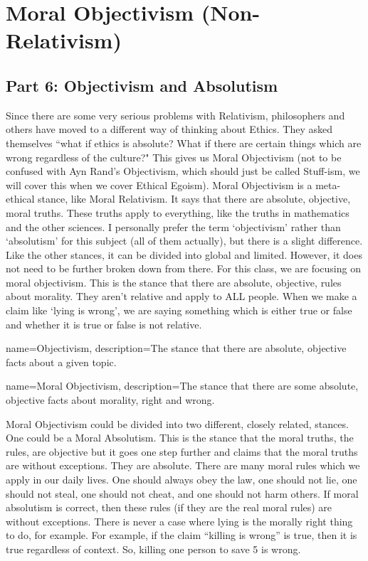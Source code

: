 \part{Moral Objectivism (Non-Relativism)}
\label{ch.mod2}
\chapter{Part 6: Objectivism and Absolutism}
Since there are some very serious problems with Relativism, philosophers and others have moved to a different way of thinking about Ethics. They asked themselves ``what if ethics is absolute? What if there are certain things which are wrong regardless of the culture?" This gives us \gls{Moral Objectivism} (not to be confused with Ayn Rand's Objectivism, which should just be called Stuff-ism, we will cover this when we cover Ethical Egoism). Moral Objectivism is a meta-ethical stance, like Moral Relativism. It says that there are absolute, objective, moral truths. These truths apply to everything, like the truths in mathematics and the other sciences.  I personally prefer the term ‘objectivism’ rather than ‘absolutism’ for this subject (all of them actually), but there is a slight difference. Like the other stances, it can be divided into global and limited. However, it does not need to be further broken down from there. For this class, we are focusing on moral objectivism. This is the stance that there are absolute, objective, rules about morality. They aren’t relative and apply to ALL people. When we make a claim like ‘lying is wrong’, we are saying something which is either true or false and whether it is true or false is not relative.

{
  name=Objectivism,
  description={The stance that there are absolute, objective facts about a given topic.}
}

{
  name=Moral Objectivism,
  description={The stance that there are some absolute, objective facts about morality, right and wrong.}
}


Moral Objectivism could be divided into two different, closely related, stances. One could be a \gls{Moral Absolutism}. This is the stance that the moral truths, the rules, are objective but it goes one step further and claims that the moral truths are without exceptions. They are absolute. There are many moral rules which we apply in our daily lives. One should always obey the law, one should not lie, one should not steal, one should not cheat, and one should not harm others. If moral absolutism is correct, then these rules (if they are the real moral rules) are without exceptions. There is never a case where lying is the morally right thing to do, for example. For example, if the claim “killing is wrong” is true, then it is true regardless of context. So, killing one person to save 5 is wrong. 

